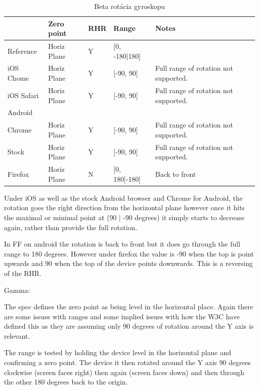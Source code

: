 \begin{table}[H]
  \begin{tabular}{ | l | l | l | l | l |}
  \hline
              & Zero point    & RHR   & Range         & Notes\\ \hline
  Reference   & Horiz Plane   & Y     & [0, -180|180] & \\  
  iOS Chome   & Horiz Plane   & Y     & [-90, 90]     & Full range of rotation not supported. \\  
  iOS Safari  & Horiz Plane   & Y     & [-90, 90]     & Full range of rotation not supported. \\  
  Android & & & & \\  
  Chrome      & Horiz Plane   & Y     & [-90, 90]     & Full range of rotation not supported. \\  
  Stock       & Horiz Plane   & Y     & [-90, 90]     & Full range of rotation not supported. \\  
  Firefox     & Horiz Plane   & N     & [0, 180|-180] & Back to front \\
  \hline
  \end{tabular}
  \caption[Beta rotácia gyroskopu]{Beta rotácia gyroskopu}
\end{table}

Under iOS as well as the stock Android browser and Chrome for Android, the rotation goes the right direction from the horizontal plane however once it hits the maximal or minimal point at (90 | -90 degrees) it simply starts to decrease again, rather than provide the full rotation.

In FF on android the rotation is back to front but it does go through the full range to 180 degrees. However under firefox the value is -90 when the top is point upwards and 90 when the top of the device points downwards. This is a reversing of the RHR.

Gamma:

The spec defines the zero point as being level in the horizontal place. Again there are some issues with ranges and some implied issues with how the W3C have defined this as they are assuming only 90 degrees of rotation around the Y axis is relevant.

The range is tested by holding the device level in the horizontal plane and confirming a zero point. The device it then rotated around the Y axis 90 degrees clockwise (screen faces right) then again (screen faces down) and then through the other 180 degrees back to the origin.

